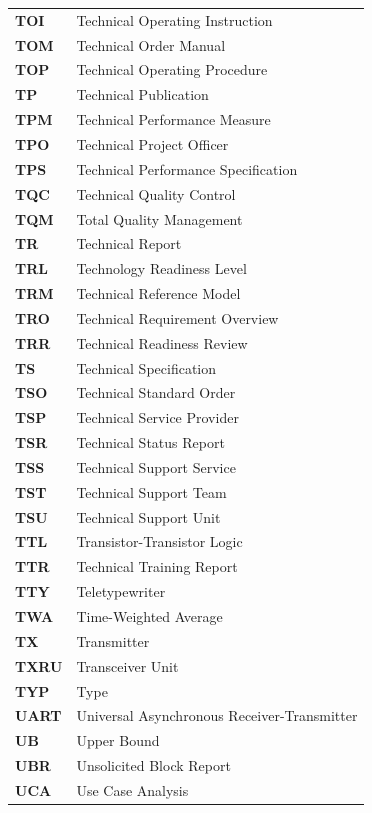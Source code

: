 \begin{longtable}{p{3cm}p{11cm}}
\textbf{TOI} & Technical Operating Instruction \\
\textbf{TOM} & Technical Order Manual \\
\textbf{TOP} & Technical Operating Procedure \\
\textbf{TP} & Technical Publication \\
\textbf{TPM} & Technical Performance Measure \\
\textbf{TPO} & Technical Project Officer \\
\textbf{TPS} & Technical Performance Specification \\
\textbf{TQC} & Technical Quality Control \\
\textbf{TQM} & Total Quality Management \\
\textbf{TR} & Technical Report \\
\textbf{TRL} & Technology Readiness Level \\
\textbf{TRM} & Technical Reference Model \\
\textbf{TRO} & Technical Requirement Overview \\
\textbf{TRR} & Technical Readiness Review \\
\textbf{TS} & Technical Specification \\
\textbf{TSO} & Technical Standard Order \\
\textbf{TSP} & Technical Service Provider \\
\textbf{TSR} & Technical Status Report \\
\textbf{TSS} & Technical Support Service \\
\textbf{TST} & Technical Support Team \\
\textbf{TSU} & Technical Support Unit \\
\textbf{TTL} & Transistor-Transistor Logic \\
\textbf{TTR} & Technical Training Report \\
\textbf{TTY} & Teletypewriter \\
\textbf{TWA} & Time-Weighted Average \\
\textbf{TX} & Transmitter \\
\textbf{TXRU} & Transceiver Unit \\
\textbf{TYP} & Type \\
\textbf{UART} & Universal Asynchronous Receiver-Transmitter \\
\textbf{UB} & Upper Bound \\
\textbf{UBR} & Unsolicited Block Report \\
\textbf{UCA} & Use Case Analysis \\

\end{longtable}
